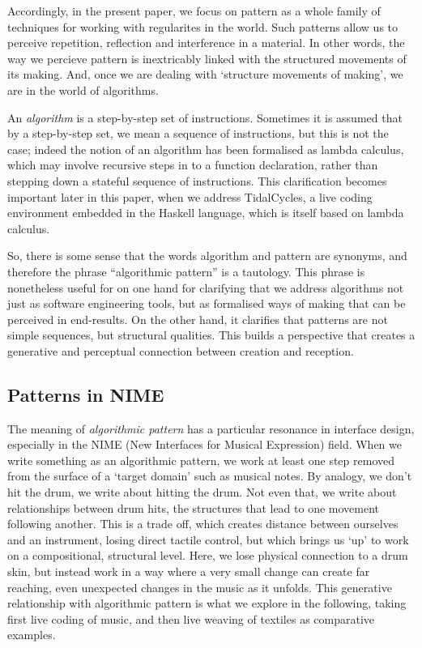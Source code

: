 \documentclass[
]{article}
\begin{document}
Accordingly, in the present paper, we focus on pattern as a whole family
of techniques for working with regularites in the world. Such patterns
allow us to perceive repetition, reflection and interference in a
material. In other words, the way we percieve pattern is inextricably
linked with the structured movements of its making. And, once we are
dealing with `structure movements of making', we are in the world of
algorithms.

An \emph{algorithm} is a step-by-step set of instructions. Sometimes it
is assumed that by a step-by-step set, we mean a sequence of
instructions, but this is not the case; indeed the notion of an
algorithm has been formalised as lambda calculus, which may involve
recursive steps in to a function declaration, rather than stepping down
a stateful sequence of instructions. This clarification becomes
important later in this paper, when we address TidalCycles, a live
coding environment embedded in the Haskell language, which is itself
based on lambda calculus.

So, there is some sense that the words algorithm and pattern are
synonyms, and therefore the phrase ``algorithmic pattern'' is a
tautology. This phrase is nonetheless useful for on one hand for
clarifying that we address algorithms not just as software engineering
tools, but as formalised ways of making that can be perceived in
end-results. On the other hand, it clarifies that patterns are not
simple sequences, but structural qualities. This builds a perspective
that creates a generative and perceptual connection between creation and
reception.

\hypertarget{patterns-in-nime}{%
\subsection{Patterns in NIME}\label{patterns-in-nime}}

The meaning of \emph{algorithmic pattern} has a particular resonance in
interface design, especially in the NIME (New Interfaces for Musical
Expression) field. When we write something as an algorithmic pattern, we
work at least one step removed from the surface of a `target domain'
such as musical notes. By analogy, we don't hit the drum, we write about
hitting the drum. Not even that, we write about relationships between
drum hits, the structures that lead to one movement following another.
This is a trade off, which creates distance between ourselves and an
instrument, losing direct tactile control, but which brings us `up' to
work on a compositional, structural level. Here, we lose physical
connection to a drum skin, but instead work in a way where a very small
change can create far reaching, even unexpected changes in the music as
it unfolds. This generative relationship with algorithmic pattern is
what we explore in the following, taking first live coding of music, and
then live weaving of textiles as comparative examples.
\end{document}
